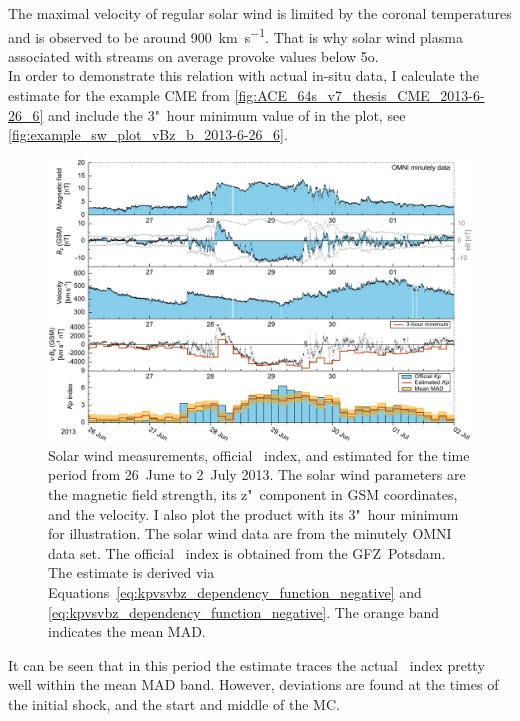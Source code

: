 The maximal velocity of regular solar wind is limited by the coronal temperatures \citep{Parker1958} and is observed to be around \SI{900}{\km\per\s}. That is why solar wind plasma associated with streams on average provoke \Kp{} values below 5o.\\

In order to demonstrate this relation with actual in-situ data, I calculate the \Kp{} estimate for the example CME from \autoref{fig:ACE_64s_v7_thesis_CME_2013-6-26_6} and include the 3"~hour minimum value of \vBz{} in the plot, see \autoref{fig:example_sw_plot_vBz_b_2013-6-26_6}.
\begin{figure}[htb]
	\centering
	\includegraphics[width=\textwidth]{figures_of_mine/chapter2/example_sw_plot_vBz_b_2013-6-26_6.pdf}
	\caption[]
	{Solar wind measurements, official \Kp{}~index, and estimated \Kp{} for the time period from 26~June to 2~July 2013. The solar wind parameters are the magnetic field strength, its z"~component in GSM coordinates, and the velocity. I also plot the product \vBz{} with its 3"~hour minimum for illustration. The solar wind data are from the minutely OMNI data set. The official \Kp{}~index is obtained from the GFZ~Potsdam. The \Kp{} estimate is derived via Equations~\ref{eq:kpvsvbz_dependency_function_negative} and \ref{eq:kpvsvbz_dependency_function_negative}. The orange band indicates the mean MAD.}
	\label{fig:example_sw_plot_vBz_b_2013-6-26_6}
\end{figure}
It can be seen that in this period the \Kp{} estimate traces the actual \Kp{}~index pretty well within the mean MAD band. However, deviations are found at the times of the initial shock, and the start and middle of the MC.

